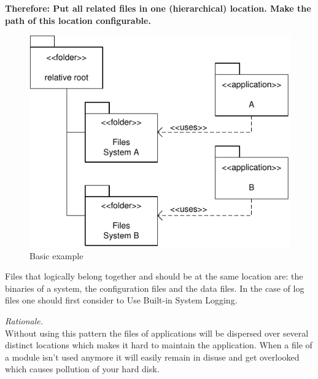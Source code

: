 \begin{center}
   
\end{center}

\textbf{Therefore: Put all related files in one (hierarchical) location. Make the path of this location configurable.}\\

\begin{figure}[h]
\centering
\includegraphics{patterns/singleFileLocationDiagram-01.pdf}
\caption{Basic example}
\label{fig:singleFileLocationDiagram-01}
\end{figure}

Files that logically belong together and should be at the same location are: the binaries of a system, the configuration files and the data files. In the case of log files one should first consider to {\sc Use Built-in System Logging}.

 
\begin{center}
   
\end{center}

\textit{Rationale.}\\
Without using this pattern the files of applications will be dispersed over several distinct locations which makes it hard to maintain the application. When a file of a module isn't used anymore it will easily remain in disuse and get overlooked which causes pollution of your hard disk.

